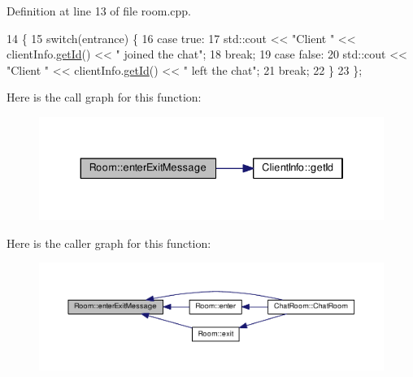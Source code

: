 Definition at line 13 of file room.\+cpp.


\begin{DoxyCode}
14 \{
15     \textcolor{keywordflow}{switch}(entrance) \{
16         \textcolor{keywordflow}{case} \textcolor{keyword}{true}:
17             std::cout << \textcolor{stringliteral}{"Client "} << clientInfo.\hyperlink{class_client_info_a55ac97ddc9f3e2d2719614c07f71e3af}{getId}() << \textcolor{stringliteral}{" joined the chat"};
18             \textcolor{keywordflow}{break};
19         \textcolor{keywordflow}{case} \textcolor{keyword}{false}:
20             std::cout << \textcolor{stringliteral}{"Client "} << clientInfo.\hyperlink{class_client_info_a55ac97ddc9f3e2d2719614c07f71e3af}{getId}() << \textcolor{stringliteral}{" left the chat"};
21             \textcolor{keywordflow}{break};
22     \}
23 \};
\end{DoxyCode}


Here is the call graph for this function\+:
\nopagebreak
\begin{figure}[H]
\begin{center}
\leavevmode
\includegraphics[width=334pt]{class_room_a463a61c145c7609cfc3433cb201ad71f_cgraph}
\end{center}
\end{figure}




Here is the caller graph for this function\+:
\nopagebreak
\begin{figure}[H]
\begin{center}
\leavevmode
\includegraphics[width=350pt]{class_room_a463a61c145c7609cfc3433cb201ad71f_icgraph}
\end{center}
\end{figure}


